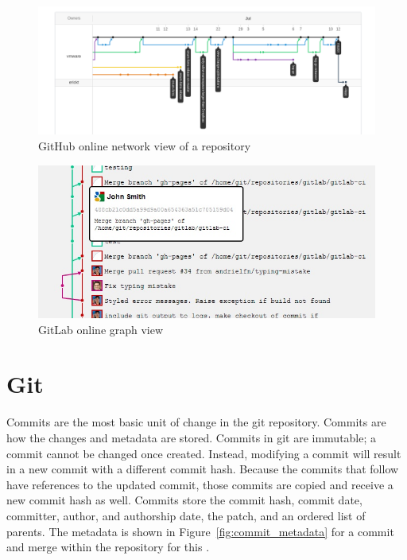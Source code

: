 \begin{figure}[htpb]
  \centering
  \includegraphics[width=0.8\linewidth]{Figures/introduction/github_dag.png}
  \caption{GitHub online network view of a repository}
  \label{fig:github_dag_screenshot}
\end{figure}

\begin{figure}[htpb]
  \centering
  \includegraphics[width=0.8\linewidth]{Figures/introduction/gitlab_graph.jpg}
  \caption{GitLab online graph view}
  \label{fig:gitlab_dag_screenshot}
\end{figure}

\section{Git}
\label{sec:git}

Commits are the most basic unit of change in the git repository.
Commits are how the changes and metadata are stored.
Commits in git are immutable; a commit cannot be changed once created.
Instead, modifying a commit will result
in a new commit with a different commit hash.
Because the commits that follow have references to the updated commit,
those commits are copied and receive a new commit hash as well.
Commits store the commit hash, commit date,
committer, author, and authorship date, the patch, and an ordered list
of parents. The metadata is shown in Figure~\ref{fig:commit_metadata}
for a commit and merge within the repository for this \paper{}.

